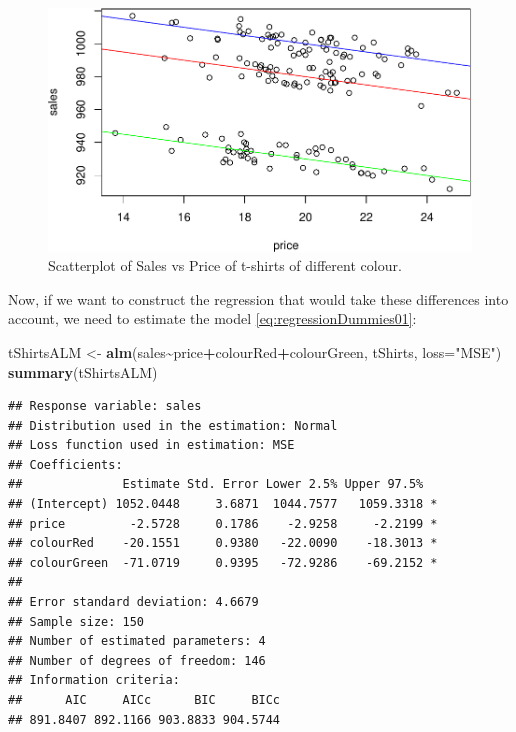\documentclass[
]{book}
\newenvironment{Shaded}{\begin{snugshade}}{\end{snugshade}}
\newcommand{\DataTypeTok}[1]{\textcolor[rgb]{0.13,0.29,0.53}{#1}}
\newcommand{\KeywordTok}[1]{\textcolor[rgb]{0.13,0.29,0.53}{\textbf{#1}}}
\newcommand{\NormalTok}[1]{#1}
\newcommand{\OperatorTok}[1]{\textcolor[rgb]{0.81,0.36,0.00}{\textbf{#1}}}
\newcommand{\StringTok}[1]{\textcolor[rgb]{0.31,0.60,0.02}{#1}}
\theoremstyle{definition}
\theoremstyle{definition}
\theoremstyle{definition}
\theoremstyle{definition}
\theoremstyle{remark}
\begin{document}
\begin{figure}
\centering
\includegraphics{Svetunkov---Statistics-for-Business-Analytics_files/figure-latex/tShirtsScatterPlot-1.pdf}
\caption{\label{fig:tShirtsScatterPlot}Scatterplot of Sales vs Price of t-shirts of different colour.}
\end{figure}

Now, if we want to construct the regression that would take these differences into account, we need to estimate the model \eqref{eq:regressionDummies01}:

\begin{Shaded}
\begin{Highlighting}[]
\NormalTok{tShirtsALM \textless{}{-}}\StringTok{ }\KeywordTok{alm}\NormalTok{(sales}\OperatorTok{\textasciitilde{}}\NormalTok{price}\OperatorTok{+}\NormalTok{colourRed}\OperatorTok{+}\NormalTok{colourGreen, tShirts, }\DataTypeTok{loss=}\StringTok{"MSE"}\NormalTok{)}
\KeywordTok{summary}\NormalTok{(tShirtsALM)}
\end{Highlighting}
\end{Shaded}

\begin{verbatim}
## Response variable: sales
## Distribution used in the estimation: Normal
## Loss function used in estimation: MSE
## Coefficients:
##              Estimate Std. Error Lower 2.5% Upper 97.5%  
## (Intercept) 1052.0448     3.6871  1044.7577   1059.3318 *
## price         -2.5728     0.1786    -2.9258     -2.2199 *
## colourRed    -20.1551     0.9380   -22.0090    -18.3013 *
## colourGreen  -71.0719     0.9395   -72.9286    -69.2152 *
## 
## Error standard deviation: 4.6679
## Sample size: 150
## Number of estimated parameters: 4
## Number of degrees of freedom: 146
## Information criteria:
##      AIC     AICc      BIC     BICc 
## 891.8407 892.1166 903.8833 904.5744
\end{verbatim}
\end{document}
